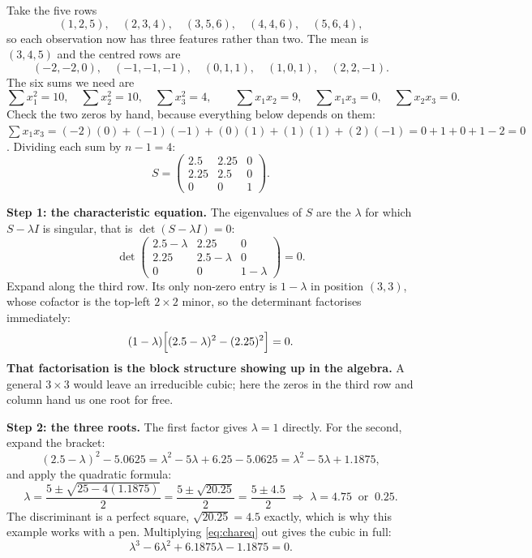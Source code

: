 \documentclass[11pt]{article}
\begin{document}
\begin{worked}
Take the five rows
\[
  (1,2,5),\quad (2,3,4),\quad (3,5,6),\quad (4,4,6),\quad (5,6,4),
\]
so each observation now has three features rather than two. The mean is
$(3,4,5)$ and the centred rows are
\[
  (-2,-2,0),\quad (-1,-1,-1),\quad (0,1,1),\quad (1,0,1),\quad (2,2,-1).
\]
The six sums we need are
\[
  \textstyle\sum x_1^2 = 10,\quad \sum x_2^2 = 10,\quad \sum x_3^2 = 4,
  \qquad
  \sum x_1x_2 = 9,\quad \sum x_1x_3 = 0,\quad \sum x_2x_3 = 0 .
\]
Check the two zeros by hand, because everything below depends on them:
$\sum x_1x_3 = (-2)(0) + (-1)(-1) + (0)(1) + (1)(1) + (2)(-1)
= 0 + 1 + 0 + 1 - 2 = 0$. Dividing each sum by $n - 1 = 4$:
\begin{equation}
  \label{eq:cov}
  S = \begin{pmatrix}
    2.5 & 2.25 & 0 \\ 2.25 & 2.5 & 0 \\ 0 & 0 & 1
  \end{pmatrix}.
\end{equation}

\medskip
\textbf{Step 1: the characteristic equation.} The eigenvalues of $S$ are the
$\lambda$ for which $S - \lambda I$ is singular, that is
$\det(S - \lambda I) = 0$:
\[
  \det\!\begin{pmatrix}
    2.5-\lambda & 2.25 & 0\\
    2.25 & 2.5-\lambda & 0\\
    0 & 0 & 1-\lambda
  \end{pmatrix} = 0 .
\]
Expand along the third row. Its only non-zero entry is $1-\lambda$ in position
$(3,3)$, whose cofactor is the top-left $2\times2$ minor, so the determinant
factorises immediately:
\begin{equation}
  \label{eq:chareq}
  (1-\lambda)\Bigl[(2.5-\lambda)^2 - (2.25)^2\Bigr] = 0 .
\end{equation}
\textbf{That factorisation is the block structure showing up in the algebra.}
A general $3\times3$ would leave an irreducible cubic; here the zeros in the
third row and column hand us one root for free.

\medskip
\textbf{Step 2: the three roots.} The first factor gives $\lambda = 1$
directly. For the second, expand the bracket:
\[
  (2.5-\lambda)^2 - 5.0625 = \lambda^2 - 5\lambda + 6.25 - 5.0625
                           = \lambda^2 - 5\lambda + 1.1875 ,
\]
and apply the quadratic formula:
\[
  \lambda = \frac{5 \pm \sqrt{25 - 4(1.1875)}}{2}
          = \frac{5 \pm \sqrt{20.25}}{2}
          = \frac{5 \pm 4.5}{2}
          \;\Longrightarrow\; \lambda = 4.75 \ \text{ or } \ 0.25 .
\]
The discriminant is a perfect square, $\sqrt{20.25} = 4.5$ exactly, which is
why this example works with a pen. Multiplying \eqref{eq:chareq} out gives the
cubic in full:
\begin{equation}
  \label{eq:cubic}
  \lambda^3 - 6\lambda^2 + 6.1875\lambda - 1.1875 = 0 .
\end{equation}


\end{worked}
\end{document}
